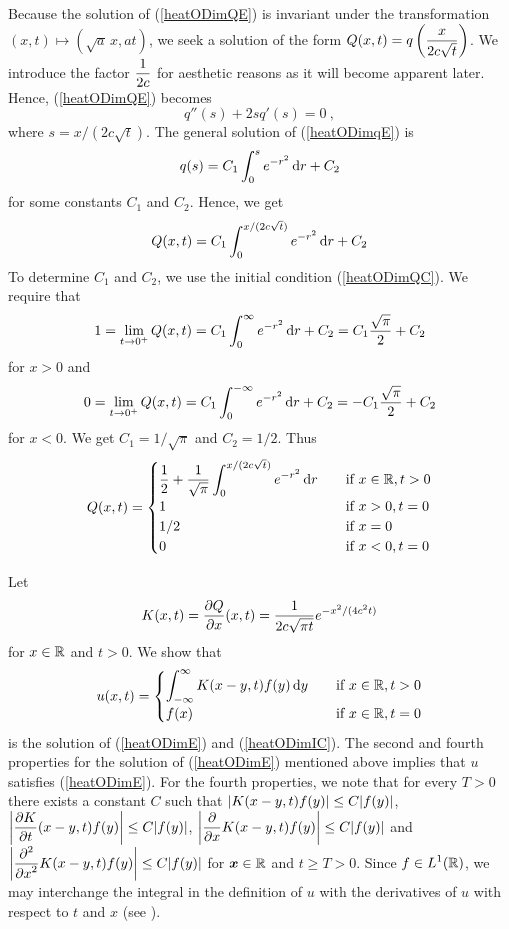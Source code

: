 Because the solution of (\ref{heatODimQE}) is invariant under the
transformation $(x,t) \mapsto (\sqrt{a}\,x, at)$, we seek a solution
of the form
$\DS Q(x,t) = q\left(\frac{x}{2c\sqrt{t}}\right)$.
We introduce the factor $\DS \frac{1}{2c}$ for aesthetic
reasons as it will become apparent later.  Hence, (\ref{heatODimQE}) becomes
\begin{equation} \label{heatODimqE}
q''(s) + 2 s q'(s) = 0 \ ,
\end{equation}
where $s= x/(2c\sqrt{t})$.  The general solution of (\ref{heatODimqE})
is
\[
q(s) = C_1 \int_0^s e^{-r^2} \dx{r} + C_2
\]
for some constants $C_1$ and $C_2$.  Hence, we get
\begin{equation} \label{heatODimQSone}
Q(x,t) = C_1 \int_0^{x/(2c\sqrt{t})} e^{-r^2}\dx{r} + C_2
\end{equation}
To determine $C_1$ and $C_2$, we use the initial condition
(\ref{heatODimQC}).  We require that
\[
1 = \lim_{t\to 0^+} Q(x,t) = C_1 \int_0^{\infty} e^{-r^2} \dx{r} + C_2
= C_1 \frac{\sqrt{\pi}}{2} + C_2
\]
for $x>0$ and
\[
0 = \lim_{t\to 0^+} Q(x,t) = C_1 \int_0^{-\infty} e^{-r^2} \dx{r} + C_2
= - C_1 \frac{\sqrt{\pi}}{2} + C_2
\]
for $x<0$.  We get $C_1 = 1/\sqrt{\pi}$ and $C_2 = 1/2$.  Thus
\[
Q(x,t) = \begin{cases} \DS
\frac{1}{2} + \frac{1}{\sqrt{\pi}} \int_0^{x/(2c\sqrt{t})}
e^{-r^2}\dx{r} & \quad \text{if} \ x\in \RR, t>0 \\
1 & \quad \text{if} \ x>0 , t = 0\\
1/2 & \quad \text{if} \ x = 0 \\
0 & \quad \text{if} \ x< 0 , t = 0
\end{cases}
\]

Let
\[
K(x,t) = \pdydx{Q}{x}(x,t) = \frac{1}{2c\sqrt{\pi t}} e^{-x^2/(4c^2t)}
\]
for $x\in \RR$ and $t > 0$.  We show that
\begin{equation} \label{heatODimSolH}
u(x,t) = \begin{cases}
\DS \int_{-\infty}^{\infty} K(x-y,t) f(y) \dx{y}
& \quad \text{if} \ x\in \RR, t>0 \\
f(x) & \quad \text{if} \ x \in \RR, t = 0 
\end{cases}
\end{equation}
is the solution of (\ref{heatODimE}) and (\ref{heatODimIC}).  The
second and fourth properties for the solution of (\ref{heatODimE})
mentioned above implies that $u$ satisfies (\ref{heatODimE}).  For the
fourth properties, we note that for every $T>0$ there exists a constant
$C$ such that
$\DS |K(x-y,t) f(y)| \leq C |f(y)|$,
$\DS \left| \pdydx{K}{t}(x-y,t) f(y)\right| \leq C |f(y)|$,
$\DS \left| \pdfdx{K}{x}(x-y,t) f(y)\right| \leq C |f(y)|$
and
$\DS \left| \pdfdxn{K}{x}{2}(x-y,t) f(y)\right| \leq C |f(y)|$
for $\VEC{x} \in \RR$ and $t \geq T > 0$.  Since
$\DS f \in L^1(\RR)$, we
may interchange the integral in the definition of $u$ with the
derivatives of $u$ with respect to $t$ and $x$ (see \cite{Flem}).

